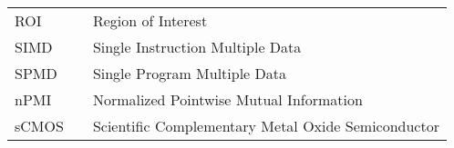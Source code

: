 \begin{center}
\begin{tabular}{lll}
      ROI               & \dotfill      & Region of Interest  \\
      SIMD               & \dotfill      & Single Instruction Multiple Data \\
      SPMD               & \dotfill      & Single Program Multiple Data \\
      nPMI               & \dotfill      & Normalized Pointwise Mutual Information  \\
      sCMOS               & \dotfill      & Scientific Complementary Metal Oxide Semiconductor \\
    \end{tabular}
\end{center}

